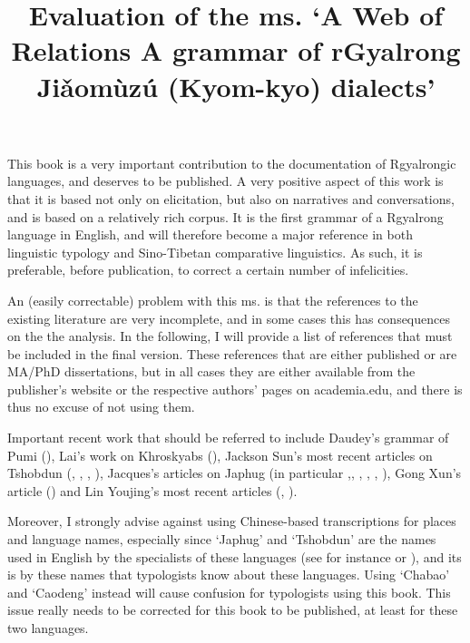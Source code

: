 \documentclass[oldfontcommands,oneside,a4paper,11pt]{article}
\begin{document}
 
\title{Evaluation of the ms. `A Web of Relations A grammar of rGyalrong Jiǎomùzú (Kyom-kyo) dialects'} 
\maketitle 
\sloppy

 This book is a very important contribution to the documentation of Rgyalrongic languages, and deserves to be published. A very positive aspect of this work is that it is based not only on elicitation, but also on narratives and conversations, and is based on a relatively rich corpus. It is the first grammar of a Rgyalrong language in English, and will therefore become a major reference in both linguistic typology and Sino-Tibetan comparative linguistics. As such, it is preferable, before publication, to correct a certain number of infelicities.

An (easily correctable) problem with this ms. is that the references to the existing literature are very incomplete, and in some cases this has consequences on the the analysis. In the following, I will provide a list of references that must be included in the final version. These references that are either published or are MA/PhD dissertations, but in all cases they are either available from the publisher's website or the respective authors' pages on academia.edu, and there is thus no excuse of not using them.

Important recent work that should be referred to include Daudey's grammar of Pumi (\citealt{daudey14grammar}), Lai's work on Khroskyabs (\citealt{lai13affixale}), Jackson Sun's most recent articles on Tshobdun (\citet{sun12complementation}, \citet{sun14generic}, \citet{jackson07irrealis}, \citet{jackson14morpho}), Jacques's articles on Japhug (in particular \citet{jacques13tropative},\citet{jacques12incorp}, \citet{jacques13harmonization}, \citet{japhug14ideophones}, \citet{jacques14linking}, \citet{jacques14antipassive}), Gong Xun's article (\citealt{gongxun14agreement}) and Lin Youjing's most recent articles (\citealt{lin11direction},  \citealt{linyj12tone}).

Moreover, I strongly advise against using Chinese-based transcriptions for places and language names, especially since `Japhug' and `Tshobdun' are the names used in English by the specialists of these languages (see for instance \citealt{jackson14morpho} or \citealt{jacques13harmonization}), and its is by these names that typologists know about these languages. Using `Chabao' and `Caodeng' instead will cause confusion for typologists using this book. This issue really needs to be corrected for this book to be published, at least for these two languages.
\end{document}
